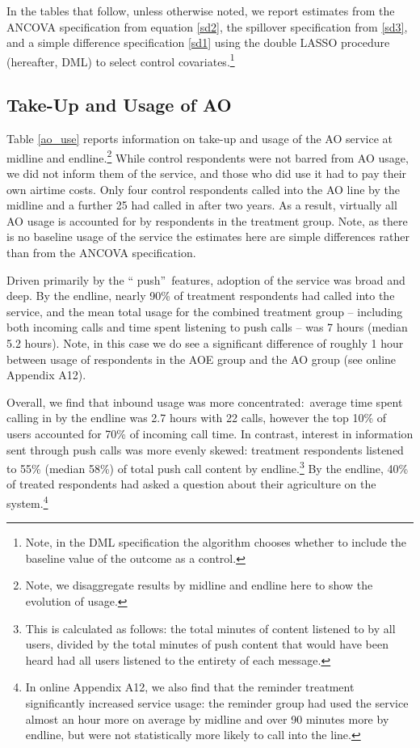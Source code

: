 \documentclass[12pt]{article}
\begin{document}
In the tables that follow, unless otherwise noted, we report estimates from the ANCOVA specification from equation \eqref{sd2}, the spillover specification from \eqref{sd3}, and a simple difference specification \eqref{sd1} using the double LASSO procedure (hereafter, DML) to select control covariates.\footnote{Note, in the DML specification the algorithm chooses whether to include the baseline value of the outcome as a control.} 

\subsection{\protect\normalsize Take-Up and Usage of AO}

{\normalsize Table \ref*{ao_use} reports information on take-up and usage of the AO service at midline and endline.\footnote{Note, we disaggregate results by midline and endline here to show the evolution of usage.} While control respondents were not barred from AO usage, we did not inform them of the service, and those who did use it had to pay their own airtime costs. Only four control respondents called into the AO line by the midline and a further 25 had called in after two years. As a result, virtually all AO usage is accounted for by respondents in the treatment group. Note, as there is no baseline usage of the service the estimates here are simple differences rather than from the ANCOVA specification.}

{\normalsize Driven primarily by the \textquotedblleft
push\textquotedblright\ features, adoption of the service was broad and
deep. By the endline, nearly 90\% of treatment respondents had called into the service, and the mean total usage for the combined treatment group -- including both incoming calls and
time spent listening to push calls -- was 7 hours (median 5.2 hours). Note, in this case we do see a significant difference of roughly 1 hour between usage of respondents in the AOE group and the AO group (see online Appendix A12).}

{\normalsize Overall, we find that inbound usage was more concentrated:\  average time spent calling in by the endline was 2.7 hours with 22 calls, however the top 10\% of users accounted for 70\% of incoming
call time. In contrast, interest in information sent through push calls was
more evenly skewed:  treatment respondents listened to 55\% (median
58\%) of total push call content by endline.\footnote{This is calculated as follows: the total minutes of content listened to by all users, divided by the total minutes of push content that would have been heard had all users listened to the entirety of each message.}  By the endline, 40\% of treated respondents had asked a question about their agriculture on the system.\footnote{In online Appendix A12, we also find that the reminder treatment significantly
increased service usage: the reminder group had used the service almost an hour more on average by
midline and over 90 minutes more by endline, but were not statistically more
likely to call into the line. }}
\end{document}
